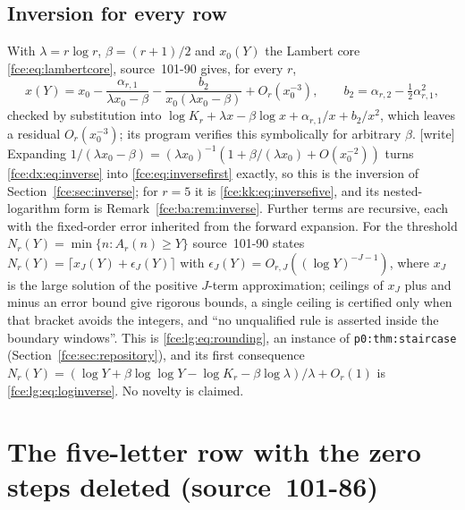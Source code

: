 \documentclass[11pt,a4paper]{article}
\numberwithin{equation}{section}
\theoremstyle{definition}\newtheorem{definition}[theorem]{Definition}
\theoremstyle{remark}\newtheorem{remark}[theorem]{Remark}
\begin{document}
\subsection{Inversion for every row}\label{fce:dx:sec:inverse90}
With $\lambda=r\log r$, $\beta=(r+1)/2$ and $x_0(Y)$ the Lambert core
\eqref{fce:eq:lambertcore}, source~101-90 gives, for every $r$,
\begin{equation}\label{fce:dx:eq:inverse}
 x(Y)=x_0-\frac{\alpha_{r,1}}{\lambda x_0-\beta}
 -\frac{b_2}{x_0(\lambda x_0-\beta)}+O_r(x_0^{-3}),\qquad
 b_2=\alpha_{r,2}-\tfrac12\alpha_{r,1}^2 ,
\end{equation}
checked by substitution into $\log K_r+\lambda x-\beta\log x+\alpha_{r,1}/x+b_2/x^2$,
which leaves a residual $O_r(x_0^{-3})$; its program verifies this
symbolically for arbitrary $\beta$. \textup{[write]} Expanding
$1/(\lambda x_0-\beta)=(\lambda x_0)^{-1}(1+\beta/(\lambda x_0)+O(x_0^{-2}))$
turns \eqref{fce:dx:eq:inverse} into \eqref{fce:eq:inversefirst} exactly, so
this is the inversion of Section~\ref{fce:sec:inverse}; for $r=5$ it is
\eqref{fce:kk:eq:inversefive}, and its nested-logarithm form is
Remark~\ref{fce:ba:rem:inverse}. Further terms are recursive, each with the
fixed-order error inherited from the forward expansion. For the threshold
$N_r(Y)=\min\{n:A_r(n)\ge Y\}$ source~101-90 states
$N_r(Y)=\lceil x_J(Y)+\epsilon_J(Y)\rceil$ with
$\epsilon_J(Y)=O_{r,J}((\log Y)^{-J-1})$, where $x_J$ is the large solution
of the positive $J$-term approximation; ceilings of $x_J$ plus and minus an
error bound give rigorous bounds, a single ceiling is certified only when that
bracket avoids the integers, and ``no unqualified rule is asserted inside the
boundary windows''. This is \eqref{fce:lg:eq:rounding}, an instance of
\texttt{p0:thm:staircase} (Section~\ref{fce:sec:repository}), and its first
consequence
$N_r(Y)=(\log Y+\beta\log\log Y-\log K_r-\beta\log\lambda)/\lambda+O_r(1)$ is
\eqref{fce:lg:eq:loginverse}. No novelty is claimed.

\section{The five-letter row with the zero steps deleted (source~101-86)}\label{fce:dx:sec:five}
\end{document}
